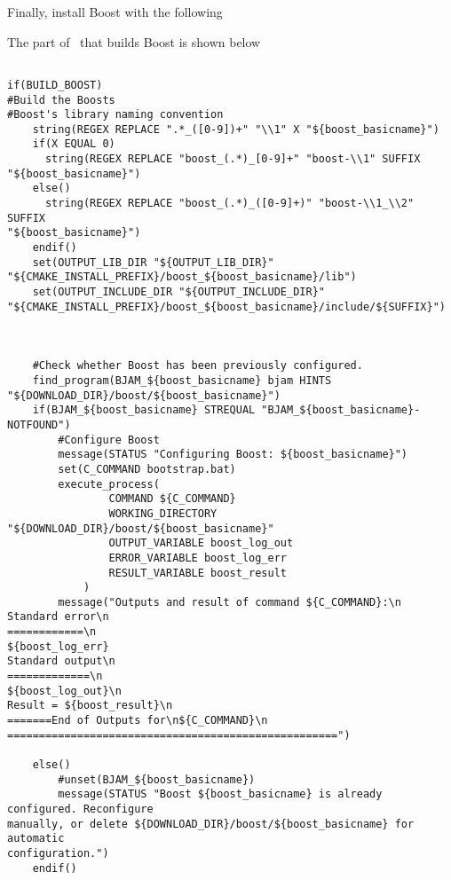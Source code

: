 \documentclass[10pt,a4paper]{article}
\begin{document}
Finally, install Boost with the following 

\begin{center}

\end{center}

The part of \chastelibbuilder\ that builds Boost is shown below

\begin{codeparchment}
\begin{lstlisting}

if(BUILD_BOOST)
#Build the Boosts
#Boost's library naming convention
	string(REGEX REPLACE ".*_([0-9])+" "\\1" X "${boost_basicname}")
	if(X EQUAL 0)
	  string(REGEX REPLACE "boost_(.*)_[0-9]+" "boost-\\1" SUFFIX
"${boost_basicname}")
	else()
	  string(REGEX REPLACE "boost_(.*)_([0-9]+)" "boost-\\1_\\2" SUFFIX
"${boost_basicname}")
	endif()
	set(OUTPUT_LIB_DIR "${OUTPUT_LIB_DIR}"
"${CMAKE_INSTALL_PREFIX}/boost_${boost_basicname}/lib")
	set(OUTPUT_INCLUDE_DIR "${OUTPUT_INCLUDE_DIR}"
"${CMAKE_INSTALL_PREFIX}/boost_${boost_basicname}/include/${SUFFIX}")



	#Check whether Boost has been previously configured.
	find_program(BJAM_${boost_basicname} bjam HINTS
"${DOWNLOAD_DIR}/boost/${boost_basicname}")
	if(BJAM_${boost_basicname} STREQUAL "BJAM_${boost_basicname}-NOTFOUND")
		#Configure Boost
		message(STATUS "Configuring Boost: ${boost_basicname}")
		set(C_COMMAND bootstrap.bat)
		execute_process(
				COMMAND ${C_COMMAND}
				WORKING_DIRECTORY "${DOWNLOAD_DIR}/boost/${boost_basicname}"
				OUTPUT_VARIABLE boost_log_out 
				ERROR_VARIABLE boost_log_err 
				RESULT_VARIABLE boost_result
			)
		message("Outputs and result of command ${C_COMMAND}:\n
Standard error\n
============\n
${boost_log_err}
Standard output\n
=============\n
${boost_log_out}\n
Result = ${boost_result}\n
=======End of Outputs for\n${C_COMMAND}\n
====================================================")
	
	else()
		#unset(BJAM_${boost_basicname})
		message(STATUS "Boost ${boost_basicname} is already configured. Reconfigure
manually, or delete ${DOWNLOAD_DIR}/boost/${boost_basicname} for automatic
configuration.")
	endif()


\end{lstlisting}
\end{codeparchment}
\end{document}

